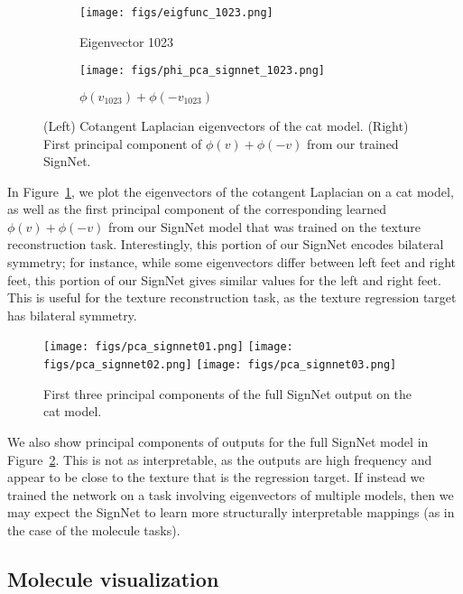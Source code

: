 \documentclass{article} \usepackage{iclr2023_conference,times}
\begin{document}
\begin{figure}[ht]
    \begin{subfigure}{.4\columnwidth}
    \centering
    \texttt{[image: figs/eigfunc\_1023.png]}
    \caption{Eigenvector 1023}
    \end{subfigure} 
    \begin{subfigure}{.4\columnwidth}
    \centering
    \texttt{[image: figs/phi\_pca\_signnet\_1023.png]}
    \caption{$\phi(v_{1023}) + \phi(-v_{1023})$}
    \end{subfigure}
    
    
    \caption{(Left) Cotangent Laplacian eigenvectors of the cat model.  (Right) First principal component of $\phi(v) + \phi(-v)$ from our trained SignNet.}
    \label{fig:cat_viz}
\end{figure}

In Figure~\ref{fig:cat_viz}, we plot the eigenvectors of the cotangent Laplacian on a cat model, as well as the first principal component of the corresponding learned $\phi(v) + \phi(-v)$ from our SignNet model that was trained on the texture reconstruction task. Interestingly, this portion of our SignNet encodes bilateral symmetry; for instance, while some eigenvectors differ between left feet and right feet, this portion of our SignNet gives similar values for the left and right feet. This is useful for the texture reconstruction task, as the texture regression target has bilateral symmetry.

\begin{figure}[h]
    \centering
    \texttt{[image: figs/pca\_signnet01.png]} \hspace{20pt}
    \texttt{[image: figs/pca\_signnet02.png]} \hspace{20pt}
    \texttt{[image: figs/pca\_signnet03.png]}
    \caption{First three principal components of the full SignNet output on the cat model.}
    \label{fig:cat_full_signnet}
\end{figure}

We also show principal components of outputs for the full SignNet model in Figure~\ref{fig:cat_full_signnet}. This is not as interpretable, as the outputs are high frequency and appear to be close to the texture that is the regression target. If instead we trained the network on a task involving eigenvectors of multiple models, then we may expect the SignNet to learn more structurally interpretable mappings (as in the case of the molecule tasks).

\subsection{Molecule visualization}\label{appendix:molecule_viz}
\end{document}
